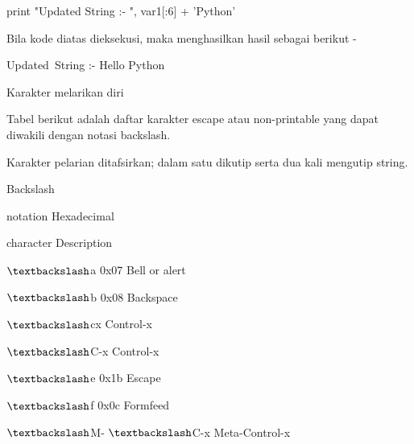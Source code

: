 \vspace{12pt}
print "Updated String :- ", var1[:6] + 'Python' \par
\vspace{12pt}
Bila kode diatas dieksekusi, maka menghasilkan hasil sebagai berikut - \par
\vspace{12pt}
Updated~String :-  Hello Python \par
\vspace{12pt}
Karakter melarikan diri \par
\vspace{12pt}
Tabel berikut adalah daftar karakter escape atau non-printable yang dapat diwakili dengan notasi backslash. \par
Karakter pelarian ditafsirkan; dalam satu dikutip serta dua kali mengutip string. \par
\vspace{12pt}
Backslash \par
notation \hspace*{0.5in} Hexadecimal \par
character \hspace*{0.5in} Description \par
 $  \textbackslash  $a \hspace*{0.5in} 0x07 \hspace*{0.5in} Bell or alert \par
 $  \textbackslash  $b \hspace*{0.5in} 0x08 \hspace*{0.5in} Backspace \par
 $  \textbackslash  $cx \hspace*{0.5in}   \hspace*{0.5in} Control-x \par
 $  \textbackslash  $C-x \hspace*{0.5in}   \hspace*{0.5in} Control-x \par
 $  \textbackslash  $e \hspace*{0.5in} 0x1b \hspace*{0.5in} Escape \par
 $  \textbackslash  $f \hspace*{0.5in} 0x0c \hspace*{0.5in} Formfeed \par
 $  \textbackslash  $M- $  \textbackslash  $C-x \hspace*{0.5in}   \hspace*{0.5in} Meta-Control-x \par
